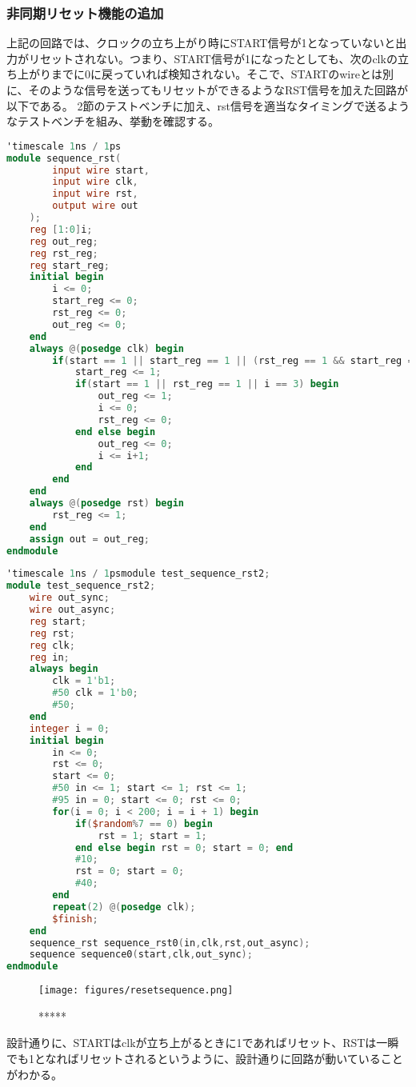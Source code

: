\documentclass[titlepage]{ltjsarticle}
\begin{document}
\subsubsection{非同期リセット機能の追加}
上記の回路では、クロックの立ち上がり時にSTART信号が1となっていないと出力がリセットされない。つまり、START信号が1になったとしても、次のclkの立ち上がりまでに0に戻っていれば検知されない。そこで、STARTのwireとは別に、そのような信号を送ってもリセットができるようなRST信号を加えた回路が以下である。
2節のテストベンチに加え、rst信号を適当なタイミングで送るようなテストベンチを組み、挙動を確認する。
\begin{lstlisting}[caption=リセット付き順序回路デザイン,language=verilog]
'timescale 1ns / 1ps
module sequence_rst(
        input wire start,
        input wire clk,
        input wire rst,
        output wire out
    );
    reg [1:0]i;
    reg out_reg;
    reg rst_reg;
    reg start_reg;
    initial begin
        i <= 0;
        start_reg <= 0;
        rst_reg <= 0;
        out_reg <= 0;
    end
    always @(posedge clk) begin
        if(start == 1 || start_reg == 1 || (rst_reg == 1 && start_reg == 1)) begin
            start_reg <= 1;
            if(start == 1 || rst_reg == 1 || i == 3) begin
                out_reg <= 1;
                i <= 0;
                rst_reg <= 0;
            end else begin
                out_reg <= 0;
                i <= i+1;
            end
        end
    end
    always @(posedge rst) begin
        rst_reg <= 1;
    end
    assign out = out_reg;
endmodule
\end{lstlisting}
\begin{lstlisting}[caption=リセット付き順序回路テストベンチ,language=verilog]
'timescale 1ns / 1psmodule test_sequence_rst2;
module test_sequence_rst2;
    wire out_sync;
    wire out_async;
    reg start;
    reg rst;
    reg clk;
    reg in;
    always begin
        clk = 1'b1;
        #50 clk = 1'b0;
        #50;
    end
    integer i = 0;
    initial begin
        in <= 0;
        rst <= 0;
        start <= 0;
        #50 in <= 1; start <= 1; rst <= 1;
        #95 in = 0; start <= 0; rst <= 0;
        for(i = 0; i < 200; i = i + 1) begin
            if($random%7 == 0) begin
                rst = 1; start = 1;
            end else begin rst = 0; start = 0; end
            #10;
            rst = 0; start = 0;
            #40;
        end
        repeat(2) @(posedge clk);
        $finish;
    end
    sequence_rst sequence_rst0(in,clk,rst,out_async);
    sequence sequence0(start,clk,out_sync);
endmodule
\end{lstlisting}
\begin{figure}[H]
    \begin{center}
        \texttt{[image: figures/resetsequence.png]}
        \caption{*****}
    \end{center}
\end{figure}
設計通りに、STARTはclkが立ち上がるときに1であればリセット、RSTは一瞬でも1となればリセットされるというように、設計通りに回路が動いていることがわかる。
\end{document}
